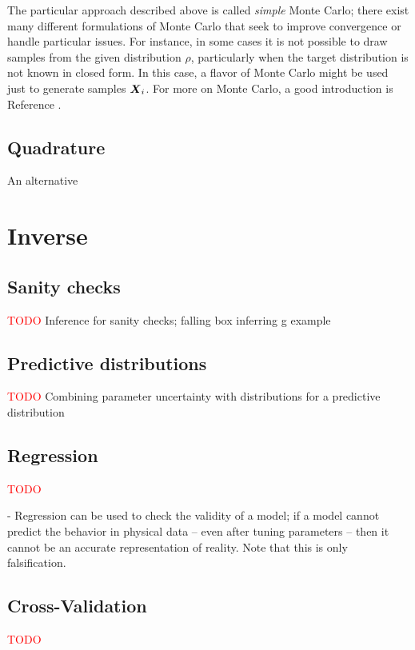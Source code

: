 \documentclass[../primer.tex]{subfiles}
\begin{document}
The particular approach described above is called \emph{simple} Monte Carlo;
there exist many different formulations of Monte Carlo that seek to improve
convergence or handle particular issues. For instance, in some cases it is not
possible to draw samples from the given distribution $\rho$, particularly when
the target distribution is not known in closed form. In this case, a flavor of
Monte Carlo might be used just to generate samples $\boldsymbol{X}_i$. For more on Monte
Carlo, a good introduction is Reference \cite{owen2013montecarlo}.

\subsection{Quadrature}
An alternative

\section{Inverse} \label{sec:inverse-propagation}

\subsection{Sanity checks}
\textcolor{red}{TODO} Inference for sanity checks; falling box inferring g example

\subsection{Predictive distributions}
\textcolor{red}{TODO} Combining parameter uncertainty with distributions for a
predictive distribution

\subsection{Regression}
\textcolor{red}{TODO}

- Regression can be used to check the validity of a model; if a model cannot
predict the behavior in physical data -- even after tuning parameters -- then it
cannot be an accurate representation of reality. Note that this is only
falsification.

\subsection{Cross-Validation}
\textcolor{red}{TODO}
\end{document}
